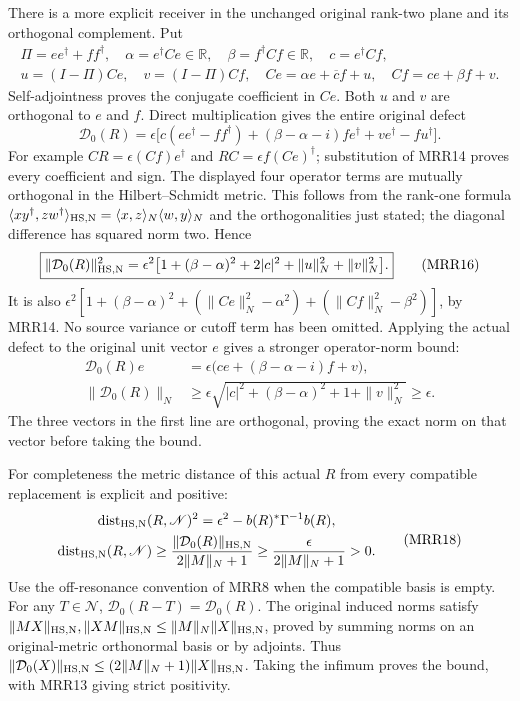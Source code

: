 There is a more explicit receiver in the unchanged original
rank-two plane and its orthogonal complement. Put
\[
\begin{gathered}
\Pi=ee^\dagger+ff^\dagger,\quad
\alpha=e^\dagger Ce\in\mathbb R,\quad
\beta=f^\dagger Cf\in\mathbb R,\quad c=e^\dagger Cf,\\
u=(I-\Pi)Ce,\quad v=(I-\Pi)Cf,\quad
Ce=\alpha e+\overline c f+u,\quad
Cf=c e+\beta f+v.
\end{gathered}
\tag{MRR14}
\]
Self-adjointness proves the conjugate coefficient in $Ce$.
Both $u$ and $v$ are orthogonal to $e$ and $f$.
Direct multiplication gives the entire original defect
\[
\boxed{
\mathcal D_0(R)
=\epsilon\bigl[c(ee^\dagger-ff^\dagger)
 +(\beta-\alpha-i)fe^\dagger+ve^\dagger-fu^\dagger\bigr].}
\tag{MRR15}
\]
For example $CR=\epsilon(Cf)e^\dagger$ and
$RC=\epsilon f(Ce)^\dagger$; substitution of MRR14 proves
every coefficient and sign.
The displayed four operator terms are mutually orthogonal
in the Hilbert--Schmidt metric. This follows from the
rank-one formula
$\langle xy^\dagger,zw^\dagger\rangle_{\rm HS,N}
=\langle x,z\rangle_N\langle w,y\rangle_N$
and the orthogonalities just stated; the diagonal difference
has squared norm two. Hence
\[
\boxed{
\|\mathcal D_0(R)\|_{\rm HS,N}^2
=\epsilon^2\bigl[1+(\beta-\alpha)^2+2|c|^2
                         +\|u\|_N^2+\|v\|_N^2\bigr].}
\tag{MRR16}
\]
It is also
$\epsilon^2[1+(\beta-\alpha)^2+
(\|Ce\|_N^2-\alpha^2)+(\|Cf\|_N^2-\beta^2)]$,
by MRR14. No source variance or cutoff term has been omitted.
Applying the actual defect to the original unit vector $e$
gives a stronger operator-norm bound:
\[
\begin{split}
\mathcal D_0(R)e&=\epsilon
                 \bigl(c e+(\beta-\alpha-i)f+v\bigr),\\
\|\mathcal D_0(R)\|_N
&\ge\epsilon\sqrt{|c|^2+(\beta-\alpha)^2+1+\|v\|_N^2}
\ge\epsilon.
\end{split}
\tag{MRR17}
\]
The three vectors in the first line are orthogonal, proving
the exact norm on that vector before taking the bound.

For completeness the metric distance of this actual $R$
from every compatible replacement is explicit and positive:
\[
\begin{gathered}
\operatorname{dist}_{\rm HS,N}(R,\mathscr N)^2
=\epsilon^2-b(R)^*\Gamma^{-1}b(R),\\
\operatorname{dist}_{\rm HS,N}(R,\mathscr N)
\ge\frac{\|\mathcal D_0(R)\|_{\rm HS,N}}{2\|M\|_N+1}
\ge\frac{\epsilon}{2\|M\|_N+1}>0.
\end{gathered}
\tag{MRR18}
\]
Use the off-resonance convention of MRR8 when the compatible
basis is empty. For any $T\in\mathscr N$,
$\mathcal D_0(R-T)=\mathcal D_0(R)$.
The original induced norms satisfy
$\|MX\|_{\rm HS,N},\|XM\|_{\rm HS,N}
\le\|M\|_N\|X\|_{\rm HS,N}$, proved by summing norms on
an original-metric orthonormal basis or by adjoints.
Thus $\|\mathcal D_0(X)\|_{\rm HS,N}
\le(2\|M\|_N+1)\|X\|_{\rm HS,N}$.
Taking the infimum proves the bound, with MRR13 giving
strict positivity.

